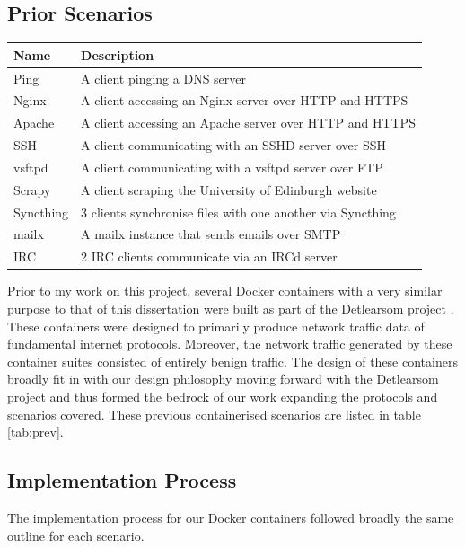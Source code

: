 \documentclass[msc,deptreport, cs]{infthesis} %
\begin{document}
\subsection{Prior Scenarios}



\begin{tabular}{ |p{2cm}||p{10cm}| }
 \hline
 Name & Description \\
 \hline
 Ping   & A client pinging a DNS server    \\
 Nginx &   A client accessing an Nginx server over HTTP and HTTPS   \\
 Apache & A client accessing an Apache server over HTTP and HTTPS \\
 SSH    & A client communicating with an SSHD server over SSH\\
 vsftpd &  A client communicating with a vsftpd server over FTP \\
 Scrapy & A client scraping the University of Edinburgh website  \\
 Syncthing& 3 clients synchronise files with one another via Syncthing\\
 mailx& A mailx instance that sends emails over SMTP \\
 IRC & 2 IRC clients communicate via an IRCd server \\
 \hline
\end{tabular}
 
Prior to my work on this project, several Docker containers with a very similar purpose to that of this dissertation were built as part of the Detlearsom project \cite{detlearsom}. These containers were designed to primarily produce network traffic data of fundamental internet protocols. Moreover, the network traffic generated by these container suites consisted of entirely benign traffic. The design of these containers broadly fit in with our design philosophy moving forward with the Detlearsom project and thus formed the bedrock of our work expanding the protocols and scenarios covered. These previous containerised scenarios are listed in table \ref{tab:prev}.



\subsection{Implementation Process}

The implementation process for our Docker containers followed broadly the same outline for each scenario. 
\end{document}
